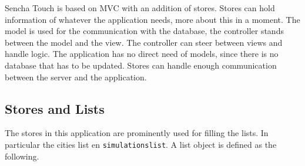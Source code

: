 Sencha Touch is based on MVC with an addition of stores. Stores can hold information of whatever the application needs, more about this in a moment. The model is used for the communication with the database, the controller stands between the model and the view. The controller can steer between views and handle logic. The application has no direct need of models, since there is no database that has to be updated. Stores can handle enough communication between the server and the application. 

\subsection{Stores and Lists}
The stores in this application are prominently used for filling the lists. In particular the cities list en \texttt{simulationslist}. A list object is defined as the following.

